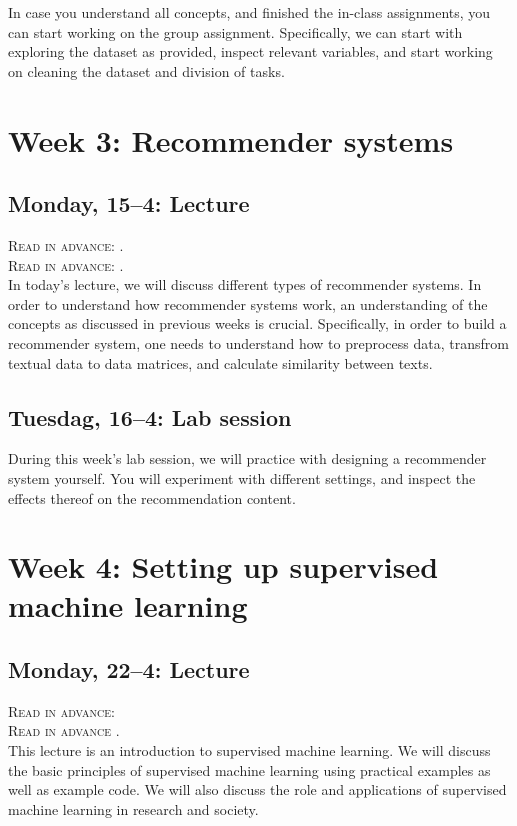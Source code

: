 In case you understand all concepts, and finished the in-class assignments, you can start working on the group assignment.  Specifically, we can start with exploring the dataset as provided, inspect relevant variables, and start working on cleaning the dataset and division of tasks. 

\section*{Week 3: Recommender systems}

\subsection*{Monday, 15--4: Lecture}
\textsc{ Read in advance: \cite{Moller2018}.}\\
\textsc{ Read in advance: \cite{Loecherbach2020}.}\\

In today's lecture, we will discuss different types of recommender systems. In order to understand how recommender systems work, an understanding of the concepts as discussed in previous weeks is crucial. Specifically, in order to build a recommender system, one needs to understand how to preprocess data, transfrom textual data to data matrices, and calculate similarity between texts. 

\subsection*{Tuesdag, 16--4: Lab session}
During this week's lab session, we will practice with designing a recommender system yourself. You will experiment with different settings, and inspect the effects thereof on the recommendation content. 

\section*{Week 4: Setting up supervised machine learning}

\subsection*{Monday, 22--4: Lecture}
\textsc{ Read in advance: \cite{vermeer_seeing_2019}}\\
\textsc{ Read in advance \cite{meppelink_reliable_2021}.}\\

This lecture is an introduction to supervised machine learning. We will discuss the basic principles of supervised machine learning using practical examples as well as example code. We will also discuss the role and applications of supervised machine learning in research and society.

